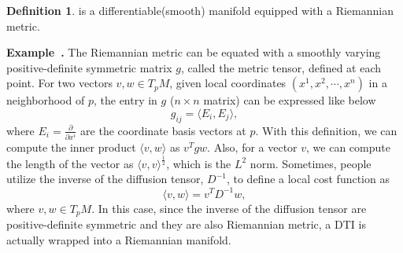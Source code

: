 \documentclass[a4paper]{article}
\theoremstyle{definition}
\newtheorem{definition}{Definition}
\theoremstyle{plain}
\newenvironment{example}[1][]{\refstepcounter{example}\par\medskip
   \noindent \textbf{Example~\theexample. #1} \rmfamily}{\medskip}
\newcounter{example}{Example}
\begin{document}
\begin{definition} 
 is a differentiable(smooth) manifold equipped with a Riemannian metric. 
\end{definition}

\begin{example}
The Riemannian metric can be equated with a smoothly varying positive-definite symmetric matrix $g$, called the metric tensor, defined at each point. For two vectors $v,w\in T_pM$, given local coordinates $(x^1, x^2,\cdots,x^n)$ in a neighborhood of $p$, the entry in $g$ ($n\times n$ matrix) can be expressed like below
\begin{equation*}
    g_{ij}=\langle E_i,E_j\rangle,
\end{equation*}
where $E_i=\frac{\partial}{\partial x^i}$ are the coordinate basis vectors at $p$. With this definition, we can compute the inner product $\langle v,w\rangle$ as $v^Tgw$. Also, for a vector $v$, we can compute the length of the vector as $\langle v,v\rangle^\frac{1}{2}$, which is the $L^2$ norm. Sometimes, people utilize the inverse of the diffusion tensor, $D^{-1}$, to define a local cost function as
\begin{equation*}
    \langle v,w\rangle=v^TD^{-1}w,
\end{equation*}
where $v, w\in T_pM$. In this case, since the inverse of the diffusion tensor are positive-definite symmetric and they are also Riemannian metric, a DTI is actually wrapped into a Riemannian manifold.
\end{example}
\end{document}
